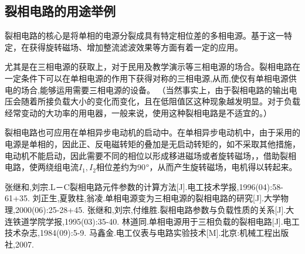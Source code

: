 \documentclass[12pt]{article}%
\begin{document}
\subsection{裂相电路的用途举例}
裂相电路的核心是将单相的电源分裂成具有特定相位差的多相电源。基于这一特定，在获得旋转磁场、增加整流滤波效果等方面有着一定的应用。\par
尤其是在三相电源的获取上，对于民用及教学演示等三相电源的场合。裂相电路在一定条件下可以在单相电源的作用下获得对称的三相电源,从而,使仅有单相电源供电的场合,能够运用需要三相电源的设备。
（当然事实上，由于裂相电路的输出电压会随着所接负载大小的变化而变化，且在低阻值区这种现象越发明显。对于负载经常变动的大功率的用电器，一般来说，使用这种裂相电路是不适宜的。）\par
裂相电路也可应用在单相异步电动机的启动中。在单相异步电动机中，由于采用的电源是单相的，因此正、反电磁转矩的叠加是无启动转矩的，如不采取其他措施，电动机不能启动，因此需要不同的相位以形成移进磁场或者旋转磁场，，借助裂相电路，使两绕组电流$I_1,I_2$相位差约为90$\degree$，从而产生旋转磁场，电机得以转起来。
\begin{thebibliography}{15}\addtolength{\itemsep}{-0.5ex}%
张继和,刘宗.L－C裂相电路元件参数的计算方法[J].电工技术学报,1996(04):58-61+35.
 刘正生,夏敦柱,翁凌.单相电源变为三相电源的裂相电路的研究[J].大学物理,2000(06):25-28+45.
 张继和,刘宗,付维胜.裂相电路参数与负载性质的关系[J].大连铁道学院学报,1995(03):35-40.
林道同.单相电源用于三相负载的裂相电路[J].电工技术杂志,1984(09):5-9.
马鑫金.电工仪表与电路实验技术[M].北京:机械工程出版社,2007.
\end{thebibliography}
\end{document}
